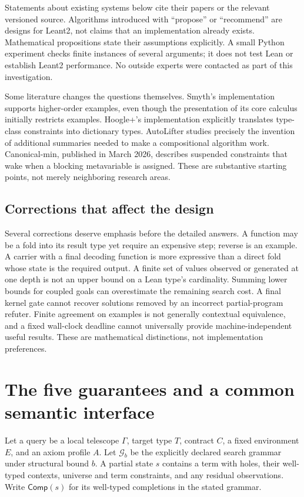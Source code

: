 \documentclass[11pt,a4paper]{article}
\newcommand{\Comp}{\mathsf{Comp}}
\theoremstyle{remark}
\begin{document}
Statements about existing systems below cite their papers or the relevant
versioned source. Algorithms introduced with ``propose'' or ``recommend'' are
designs for Leant2, not claims that an implementation already exists.
Mathematical propositions state their assumptions explicitly. A small Python
experiment checks finite instances of several arguments; it does not test
Lean or establish Leant2 performance. No outside experts were contacted as
part of this investigation.

Some literature changes the questions themselves. Smyth's implementation
supports higher-order examples, even though the presentation of its core
calculus initially restricts examples. Hoogle+'s implementation explicitly
translates type-class constraints into dictionary types. AutoLifter studies
precisely the invention of additional summaries needed to make a
compositional algorithm work. Canonical-min, published in March 2026,
describes suspended constraints that wake when a blocking metavariable is
assigned. These are substantive starting points, not merely neighboring
research areas.\cite{smyth,tygar,autolifter,canonicalmin}

\subsection{Corrections that affect the design}

Several corrections deserve emphasis before the detailed answers.
A function may be a fold into its result type yet require an expensive step;
reverse is an example. A carrier with a final decoding function is more
expressive than a direct fold whose state is the required output. A finite
set of values observed or generated at one depth is not an upper bound on a
Lean type's cardinality. Summing lower bounds for coupled goals can
 overestimate the remaining search cost. A final kernel gate cannot recover
solutions removed by an incorrect partial-program refuter. Finite agreement
on examples is not generally contextual equivalence, and a fixed wall-clock
deadline cannot universally provide machine-independent useful results.
These are mathematical distinctions, not implementation preferences.

\section{The five guarantees and a common semantic interface}
\label{sec:guarantees}

Let a query be a local telescope $\Gamma$, target type $T$, contract $C$, a
fixed environment $E$, and an axiom profile $A$. Let $\mathcal G_b$ be the
explicitly declared search grammar under structural bound $b$. A partial
state $s$ contains a term with holes, their well-typed contexts, universe and
term constraints, and any residual observations. Write $\Comp(s)$ for its
well-typed completions in the stated grammar.
\end{document}
